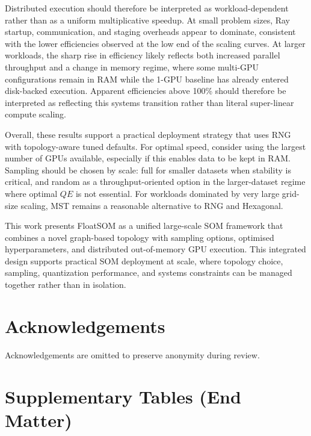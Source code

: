 \documentclass[10pt]{article} %
\begin{document}
Distributed execution should therefore be interpreted as workload-dependent rather than as a uniform multiplicative speedup. At small problem sizes, Ray startup, communication, and staging overheads appear to dominate, consistent with the lower efficiencies observed at the low end of the scaling curves. At larger workloads, the sharp rise in efficiency likely reflects both increased parallel throughput and a change in memory regime, where some multi-GPU configurations remain in RAM while the 1-GPU baseline has already entered disk-backed execution. Apparent efficiencies above 100\% should therefore be interpreted as reflecting this systems transition rather than literal super-linear compute scaling.

Overall, these results support a practical deployment strategy that uses RNG with topology-aware tuned defaults. For optimal speed, consider using the largest number of GPUs available, especially if this enables data to be kept in RAM. Sampling should be chosen by scale: full for smaller datasets when stability is critical, and random as a throughput-oriented option in the larger-dataset regime where optimal $QE$ is not essential. For workloads dominated by very large grid-size scaling, MST remains a reasonable alternative to RNG and Hexagonal.

This work presents FloatSOM as a unified large-scale SOM framework that combines a novel graph-based topology with sampling options, optimised hyperparameters, and distributed out-of-memory GPU execution. This integrated design supports practical SOM deployment at scale, where topology choice, sampling, quantization performance, and systems constraints can be managed together rather than in isolation.

\section{Acknowledgements}

Acknowledgements are omitted to preserve anonymity during review.



\clearpage

\appendix
\section{Supplementary Tables (End Matter)}
\setcounter{table}{0}
\renewcommand{\tablename}{Supplementary Table}
\renewcommand{\thetable}{S\arabic{table}}
\renewcommand{\theHtable}{supplementarytable.\arabic{table}}
\end{document}
